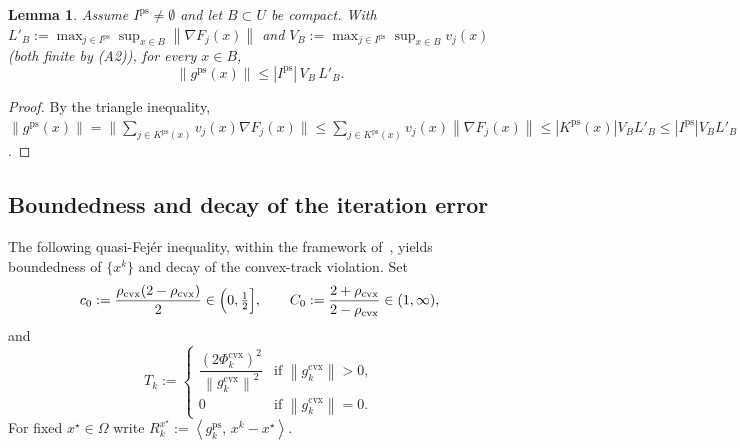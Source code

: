 \documentclass[]{interact}
\theoremstyle{plain}
\newtheorem{lemma}[theorem]{Lemma}
\theoremstyle{definition}
\theoremstyle{remark}
\newcommand{\norm}[1]{\left\lVert #1 \right\rVert}
\newcommand{\abs}[1]{\left\lvert #1 \right\rvert}
\newcommand{\inner}[2]{\left\langle #1,\, #2 \right\rangle}
\newcommand{\cvx}{\mathrm{cvx}}
\newcommand{\ps}{\mathrm{ps}}
\begin{document}
\begin{lemma}\label{lem:bound-ps}
Assume $I^{\ps}\ne\emptyset$ and let $B\subset U$ be compact. With
$L'_B:=\max_{j\in I^{\ps}}\sup_{x\in B}\norm{\nabla F_j(x)}$ and
$V_B:=\max_{j\in I^{\ps}}\sup_{x\in B}v_j(x)$ (both finite by (A2)), for every $x\in B$,
\[
\norm{g^{\ps}(x)}\le\abs{I^{\ps}}\,V_B\,L'_B .
\]
\end{lemma}
\begin{proof}
By the triangle inequality,
$\norm{g^{\ps}(x)}=\bigl\|\sum_{j\in K^{\ps}(x)}v_j(x)\nabla F_j(x)\bigr\|
\le\sum_{j\in K^{\ps}(x)}v_j(x)\norm{\nabla F_j(x)}\le\abs{K^{\ps}(x)}V_BL'_B
\le\abs{I^{\ps}}V_BL'_B$.
\end{proof}

\subsection{Boundedness and decay of the iteration error}\label{ssec:bounded}
The following quasi-Fej\'er inequality, within the framework of~\citet{combettes2001quasifejer}, yields boundedness of $\{x^k\}$ and decay of the convex-track violation. Set
\begin{equation}\label{eq:c0C0}
c_0:=\frac{\rho_{\cvx}(2-\rho_{\cvx})}{2}\in\Bigl(0,\tfrac12\Bigr],\qquad
C_0:=\frac{2+\rho_{\cvx}}{2-\rho_{\cvx}}\in(1,\infty),
\end{equation}
and
\begin{equation}\label{eq:Tk}
T_k:=\begin{cases}\dfrac{(2\Phi^{\cvx}_k)^2}{\norm{g^{\cvx}_k}^2} & \text{if }\norm{g^{\cvx}_k}>0,\\ 0 & \text{if }\norm{g^{\cvx}_k}=0.\end{cases}
\end{equation}
For fixed $x^\star\in\Omega$ write $R^{x^\star}_k:=\inner{g^{\ps}_k}{x^k-x^\star}$.
\end{document}
